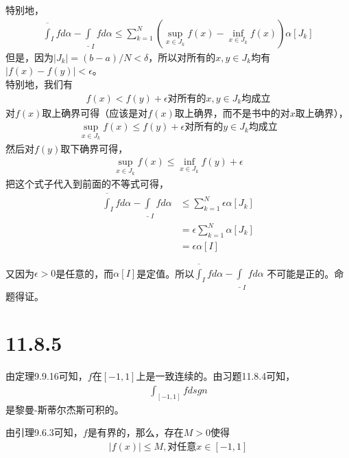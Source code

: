 \documentclass{article}
\begin{document}
特别地，
\begin{align*}
  \overline{\int}_{I} f d\alpha - \underline{\int}_{I} f d\alpha \leq \sum\limits_{k=1}^{N}\left(\sup\limits_{x \in J_k}f(x) - \inf\limits_{x \in J_k}f(x) \right) \alpha[J_k]
\end{align*}
但是，因为$|J_k| = (b - a) / N < \delta$，所以对所有的$x, y \in J_k$均有$|f(x) - f(y)| < \epsilon$。\\
特别地，我们有
\begin{align*}
  f(x) < f(y) + \epsilon \text{对所有的} x,y \in J_k \text{均成立}
\end{align*}
对$f(x)$取上确界可得（应该是对$f(x)$取上确界，而不是书中的对$x$取上确界），
\begin{align*}
  \sup\limits_{x \in J_k}f(x) \leq f(y) + \epsilon \text{对所有的} y \in J_k \text{均成立}
\end{align*}
然后对$f(y)$取下确界可得，
\begin{align*}
  \sup\limits_{x \in J_k}f(x) \leq \inf\limits_{x \in J_k} f(y) + \epsilon
\end{align*}
把这个式子代入到前面的不等式可得，
\begin{align*}
  \overline{\int}_{I} f d\alpha - \underline{\int}_{I} f d\alpha & \leq \sum\limits_{k=1}^{N} \epsilon \alpha[J_k] \\
                                                                 & = \epsilon \sum\limits_{k=1}^{N} \alpha[J_k]    \\
                                                                 & = \epsilon \alpha[I]
\end{align*}

又因为$\epsilon > 0$是任意的，而$\alpha[I]$是定值。所以$\overline{\int}_{I} f d\alpha - \underline{\int}_{I} f d\alpha$
不可能是正的。命题得证。

\section*{11.8.5}

由定理9.9.16可知，$f$在$[-1, 1]$上是一致连续的。由习题11.8.4可知，
\begin{align*}
  \int_{[-1, 1]} f dsgn
\end{align*}
是黎曼-斯蒂尔杰斯可积的。

由引理9.6.3可知，$f$是有界的，那么，存在$M > 0$使得
\begin{align*}
  |f(x)| \leq M, \text{对任意}x \in [-1, 1]
\end{align*}
\end{document}
